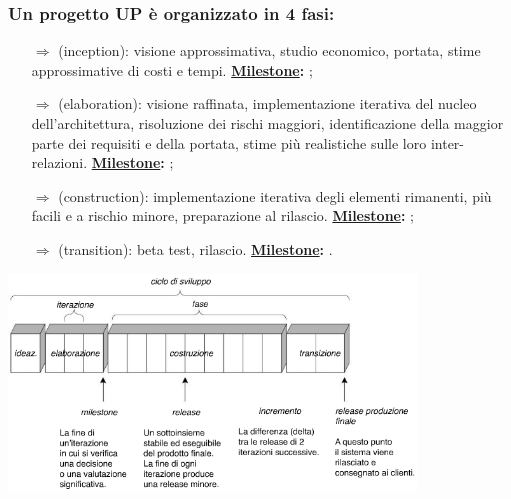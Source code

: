 \subsubsection{Un progetto UP è organizzato in 4 fasi:}

\begin{itemize}
    \item [$\Rightarrow$]  (inception): visione approssimativa, studio economico, portata, stime approssimative di costi e tempi. \textbf{\underline{Milestone}:} ;
    \item [$\Rightarrow$]  (elaboration): visione raffinata, implementazione iterativa del nucleo dell'architettura, risoluzione dei rischi maggiori, identificazione della maggior parte dei requisiti e della portata, stime più realistiche sulle loro inter-relazioni. \textbf{\underline{Milestone}:} ;  
    \item [$\Rightarrow$]  (construction): implementazione iterativa degli elementi rimanenti, più facili e a rischio minore, preparazione al rilascio. \textbf{\underline{Milestone}:} ;
    \item [$\Rightarrow$]  (transition): beta test, rilascio. \textbf{\underline{Milestone}:} .
\end{itemize}

\begin{center}
    \includegraphics[scale = 1]{images/UP.png}
\end{center}


